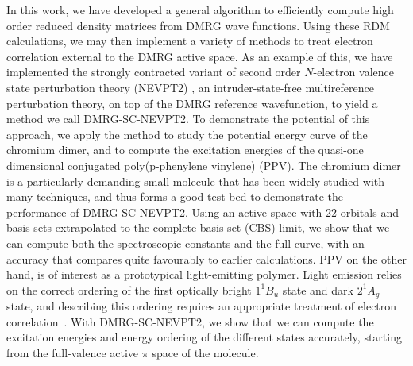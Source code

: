 In this work, we have developed a general algorithm to efficiently compute high order reduced density matrices from DMRG wave functions. 
Using these RDM calculations, we may then implement a variety of methods to treat electron correlation external to the DMRG active space.
As an example of this, we have implemented the strongly contracted variant of second order $N$-electron valence state perturbation theory (NEVPT2) 
\cite{angeli_introduction_2001,angeli_n-electron_2001, angeli_n-electron_2002}, an intruder-state-free multireference perturbation theory, on top
of the DMRG reference wavefunction, to yield a method we call DMRG-SC-NEVPT2.
To demonstrate the potential of this approach, we apply the method to study the potential energy curve of the chromium dimer, and 
to compute the excitation energies of the quasi-one dimensional conjugated poly(p-phenylene vinylene) (PPV). 
The chromium dimer is a particularly demanding small molecule that has been widely studied with many techniques\cite{roos_ground_2003,celani_cipt2_2004,angeli_third-order_2006,muller_large-scale_2009,kurashige_second-order_2011,ruiperez_complete_2011,kurashige_multireference_2014,sharma_multireference_2015}, and thus forms a good test bed to demonstrate the performance of DMRG-SC-NEVPT2. Using an active space with 22 orbitals and basis sets extrapolated to the complete basis set (CBS) limit, we show that we can
compute both the spectroscopic constants and the full curve,
with an accuracy that compares quite favourably to earlier calculations.
PPV on the other hand, is of interest as a prototypical light-emitting polymer\cite{burroughes_light-emitting_1990,friend_electroluminescence_1999, barford_book}.
Light emission relies
on the correct ordering of the first optically bright $1^{1}B_{u}$ state
and  dark $2^{1}A_{g}$ state, and describing this ordering requires an appropriate
treatment of electron correlation~\cite{beljonne_theoretical_1995,lavrentiev_theoretical_1999,shukla_correlated_2002, han_time-dependent_2004, saha_investigation_2007, bursill_symmetry-adapted_2009}.
With DMRG-SC-NEVPT2, we show that we can compute the excitation 
energies and energy ordering of the different states accurately, starting 
from the full-valence active $\pi$ space of the molecule.

